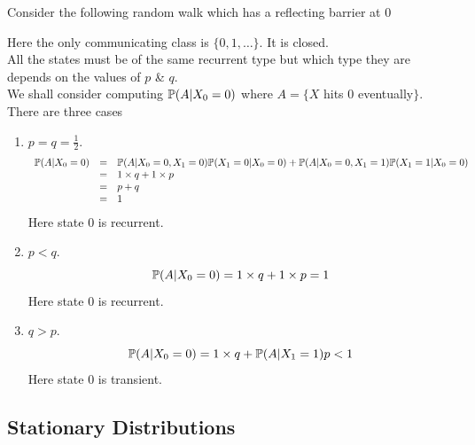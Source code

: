 \documentclass[11pt,a4paper]{article}
\begin{document}
Consider the following random walk which has a reflecting barrier at 0
\begin{center}
\end{center}
Here the only communicating class is $\{0,1,\dots\}$. It is closed.\\
All the states must be of the same recurrent type but which type they are depends on the values of $p$ \& $q$.\\
We shall consider computing $\mathbb{P}(A|X_0=0)$ where $A=\{X$ hits $0$ eventually$\}$. There are three cases
\begin{enumerate}[label=\roman*)]
	\item $p=q=\frac{1}{2}$.\\
	\[\begin{array}{rcl}
		\mathbb{P}(A|X_0=0)&=&\mathbb{P}(A|X_0=0,X_1=0)\mathbb{P}(X_1=0|X_0=0)+\mathbb{P}(A|X_0=0,X_1=1)\mathbb{P}(X_1=1|X_0=0)\\
		&=&1\times q+1\times p\\
		&=&p+q\\
		&=&1
	\end{array}\]
	Here state $0$ is recurrent.
	\item $p<q$.\\
	$$\mathbb{P}(A|X_0=0)=1\times q+1\times p=1$$
	Here state $0$ is recurrent.
	\item $q>p$.\\
	$$\mathbb{P}(A|X_0=0)=1\times q+\mathbb{P}(A|X_1=1)p<1$$
	Here state $0$ is transient.
\end{enumerate}

\subsection{Stationary Distributions}
\end{document}
